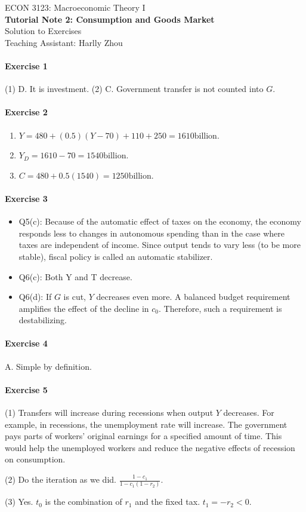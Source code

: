 \documentclass[12pt]{article}
\numberwithin{equation}{section}
\begin{document}
\begin{center}
    ECON 3123: Macroeconomic Theory I\\
    {\large \textbf{Tutorial Note 2: Consumption and Goods Market}}\\
    Solution to Exercises\\
    Teaching Assistant: Harlly Zhou
\end{center}

\paragraph{Exercise 1}
(1) D. It is investment. (2) C. Government transfer is not counted into $G$.

\paragraph{Exercise 2}
\begin{enumerate}[label=\alph*.]
    \item $Y=480+(0.5)(Y-70)+110+250=1610\text{billion}$.
    \item $Y_D = 1610 - 70 = 1540\text{billion}$.
    \item $C = 480 + 0.5(1540) = 1250 \text{billion}$.
\end{enumerate}

\paragraph{Exercise 3}
\begin{itemize}
    \item Q5(c): Because of the automatic effect of taxes on the economy, the economy responds less to changes in autonomous spending than in the case where taxes are independent of income. Since output tends to vary less (to be more stable), fiscal policy is called an automatic stabilizer.
    \item Q6(c): Both Y and T decrease.
    \item Q6(d): If $G$ is cut, $Y$ decreases even more. A balanced budget requirement amplifies the effect of the decline in $c_0$. Therefore, such a requirement is destabilizing.
\end{itemize}

\paragraph{Exercise 4}
A. Simple by definition.

\paragraph{Exercise 5}
(1) Transfers will increase during recessions when output $Y$ decreases. For example, in recessions, the unemployment rate will increase. The government pays parts of workers' original earnings for a specified amount of time. This would help the unemployed workers and reduce the negative effects of recession on consumption.

(2) Do the iteration as we did. $\frac{1-c_1}{1-c_1(1-r_2)}$.

(3) Yes. $t_0$ is the combination of $r_1$ and the fixed tax. $t_1 = -r_2<0$.
\end{document}
